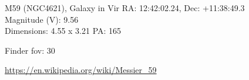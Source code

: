 \begin{block}{M59 (NGC4621), Galaxy in Vir}
    RA: 12:42:02.24, Dec: +11:38:49.3 \\ 
    Magnitude (V): 9.56 \\ 
    Dimensions: 4.55 x 3.21 PA: 165 

    Finder fov: 30 

    \url{https://en.wikipedia.org/wiki/Messier_59} 
\end{block}